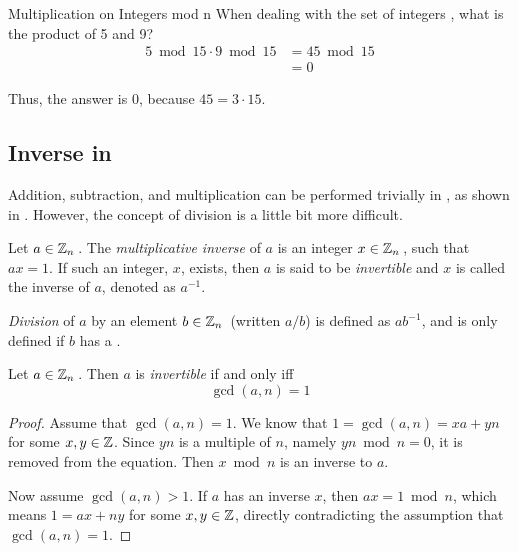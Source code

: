 \begin{example}[]{Multiplication on Integers mod n}
  When dealing with the set of integers , what is the product of 5 and 9?
  \tcblower{}
  \begin{align*}
    5 \bmod 15 \cdot 9 \bmod 15 &= 45 \bmod 15 \\
                                &= 0
  \end{align*}

  Thus, the answer is 0, because $45 = 3 \cdot 15$.
\end{example}

\subsection{\texorpdfstring{Inverse in \TextIntsModN{}}{Inverse in Integers Modulo n}}\label{subsec:Inverse_Z_mod_n}
Addition, subtraction, and multiplication can be performed trivially in \TextIntsModN{}, as shown in .
However, the concept of division is a little bit more difficult.
\begin{definition}\label{def:Multiplicative_Inverse}
  Let $a \in \operatorname{\mathbb{Z}}_{n}{}$.
  The \emph{multiplicative inverse} of $a$ is an integer $x \in \operatorname{\mathbb{Z}}_{n}{}$, such that $ax = 1$.
  If such an integer, $x$, exists, then $a$ is said to be \emph{invertible} and $x$ is called the inverse of $a$, denoted as $a^{-1}$.
\end{definition}

\begin{definition}\label{def:Division_Z_mod_n}
  \emph{Division} of $a$ by an element $b \in \operatorname{\mathbb{Z}}_{n}{}$ (written $a/b$) is defined as $ab^{-1}$, and is only defined if $b$ has a .
\end{definition}

\begin{definition}[Invertible]\label{def:Invertible}
  Let $a \in \operatorname{\mathbb{Z}}_{n}{}$.
  Then $a$ is \emph{invertible} if and only iff
  \begin{equation}\label{eq:Invertible}
    \gcd(a, n) = 1
  \end{equation}
\end{definition}

\begin{proof}
  Assume that $\gcd(a, n) = 1$.
  We know that $1 = \gcd(a, n) = xa + yn$ for some $x, y \in \operatorname{\mathbb{Z}}$.
  Since $yn$ is a multiple of $n$, namely $yn \bmod n = 0$, it is removed from the equation.
  Then $x \bmod n$ is an inverse to $a$.

  Now assume $\gcd(a, n) > 1$.
  If $a$ has an inverse $x$, then $ax = 1 \bmod n$, which means $1 = ax + ny$ for some $x, y \in \operatorname{\mathbb{Z}}$, directly contradicting the assumption that $\gcd(a, n) = 1$.
\end{proof}

